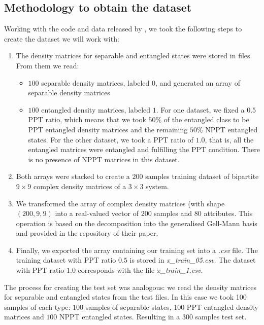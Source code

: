 \subsection{Methodology to obtain the dataset}
Working with the code and data released by \cite{casale2023large}, we took the following steps to create the dataset we will work with:
\begin{enumerate}
    \item The density matrices for separable and entangled states were stored in files. From them we read:
    \begin{itemize}
        \item $100$ separable density matrices, labeled $0$, and generated an array of separable density matrices
        \item $100$ entangled density matrices, labeled $1$. For one dataset, we fixed a $0.5$ PPT ratio, which means that we took $50\%$ of the entangled class to be PPT entangled density matrices and the remaining $50\%$ NPPT entangled states. For the other dataset, we took a PPT ratio of $1.0$, that is, all the entangled matrices were entangled and fulfilling the PPT condition. There is no presence of NPPT matrices in this dataset.
    \end{itemize}
    \item Both arrays were stacked to create a $200$ samples training dataset of bipartite $9 \times 9$ complex density matrices of a $3 \times 3$ system. 
    \item We transformed the array of complex density matrices (with shape $(200,9,9)$ into a real-valued vector of $200$ samples and $80$ attributes. This operation is based on the decomposition into the generalised Gell-Mann basis and provided in the repository of their paper.
    \item Finally, we exported the array containing our training set into a \textit{.csv} file. The training dataset with PPT ratio $0.5$ is stored in \textit{x\_train\_05.csv}. The dataset with PPT ratio $1.0$ corresponds with the file \textit{x\_train\_1.csv}.
\end{enumerate}

The process for creating the test set was analogous: we read the density matrices for separable and entangled states from the test files. In this case we took 100 samples of each type: $100$ samples of separable states, $100$ PPT entangled density matrices and $100$ NPPT entangled states. Resulting in a $300$ samples test set.

